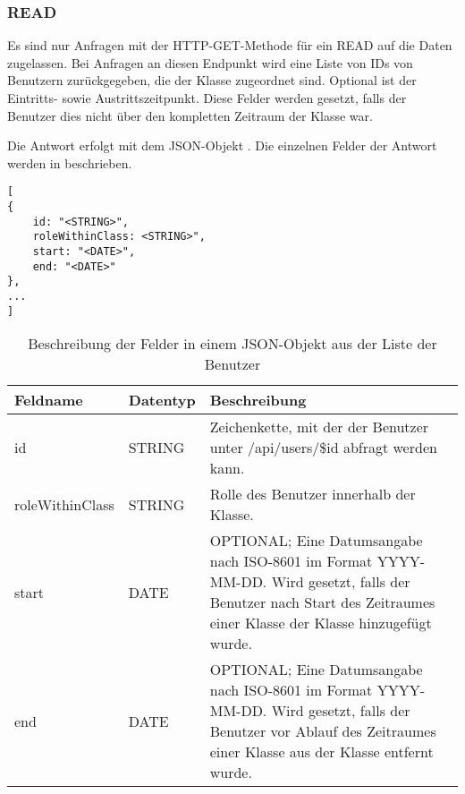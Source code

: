 \subsubsection{READ}
\label{sec:rest:api:classes:id:users:read}
Es sind nur Anfragen mit der HTTP-GET-Methode für ein READ auf die Daten zugelassen.
Bei Anfragen an diesen Endpunkt wird eine Liste von IDs von Benutzern zurückgegeben, die der Klasse zugeordnet sind.
Optional ist der Eintritts- sowie Austrittszeitpunkt. Diese Felder werden gesetzt, falls der Benutzer dies nicht über den kompletten Zeitraum der Klasse war.

Die Antwort erfolgt mit dem JSON-Objekt . 
Die einzelnen Felder der Antwort werden in  beschrieben.

\begin{lstlisting}[caption={JSON-Antwort für einen GET-Aufruf des Pfads /api/classes/\$id/users},label={lst:code:rest:api:classes:id:users:read:ret},frame=tlrb]
[
{
    id: "<STRING>",
    roleWithinClass: <STRING>",
    start: "<DATE>",
    end: "<DATE>"    
},
...
]
\end{lstlisting}

\begin{longtable}{|p{}|p{}|p{}|}
		\caption{Beschreibung der Felder in einem JSON-Objekt aus der Liste der Benutzer}
\endfoot
		\caption{Beschreibung der Felder in einem JSON-Objekt aus der Liste der Benutzer}
		\label{tab:rest:api:classes:id:users:read:ret}
\endlastfoot 
\hline
			\textbf{Feldname} & \textbf{Datentyp} & \textbf{Beschreibung} \\ \hline
\endhead
id & STRING & Zeichenkette, mit der der Benutzer unter /api/users/\$id abfragt werden kann. \\ \hline
roleWithinClass & STRING & Rolle des Benutzer innerhalb der Klasse. \\ \hline
start & DATE & OPTIONAL; Eine Datumsangabe nach ISO-8601 im Format YYYY-MM-DD. Wird gesetzt, falls der Benutzer nach Start des Zeitraumes einer Klasse der Klasse hinzugefügt wurde. \\ \hline
end & DATE & OPTIONAL; Eine Datumsangabe nach ISO-8601 im Format YYYY-MM-DD. Wird gesetzt, falls der Benutzer vor Ablauf des Zeitraumes einer Klasse aus der Klasse entfernt wurde. \\ \hline
\end{longtable}
